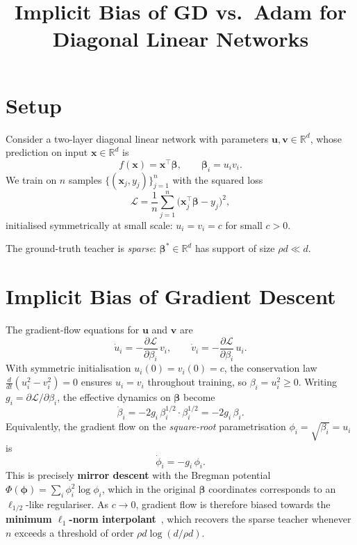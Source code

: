 \documentclass[11pt]{article}
\title{Implicit Bias of GD vs.\ Adam for Diagonal Linear Networks}
\date{}
\newcommand{\R}{\mathbb{R}}
\begin{document}
\maketitle

\section{Setup}

Consider a two-layer diagonal linear network with parameters $\mathbf{u}, \mathbf{v} \in \R^d$, whose
prediction on input $\mathbf{x} \in \R^d$ is
\[
    f(\mathbf{x}) = \mathbf{x}^\top \boldsymbol{\beta}, \qquad \boldsymbol{\beta}_i = u_i v_i.
\]
We train on $n$ samples $\{(\mathbf{x}_j, y_j)\}_{j=1}^n$ with the squared loss
\[
    \mathcal{L} = \frac{1}{n} \sum_{j=1}^n \bigl(\mathbf{x}_j^\top \boldsymbol{\beta} - y_j\bigr)^2,
\]
initialised symmetrically at small scale: $u_i = v_i = c$ for small $c > 0$.

The ground-truth teacher is \emph{sparse}: $\boldsymbol{\beta}^* \in \R^d$ has support of size $\rho d \ll d$.

\section{Implicit Bias of Gradient Descent}

The gradient-flow equations for $\mathbf{u}$ and $\mathbf{v}$ are
\[
    \dot{u}_i = -\frac{\partial \mathcal{L}}{\partial \beta_i} \, v_i, \qquad
    \dot{v}_i = -\frac{\partial \mathcal{L}}{\partial \beta_i} \, u_i.
\]
With symmetric initialisation $u_i(0) = v_i(0) = c$, the conservation law
$\tfrac{d}{dt}(u_i^2 - v_i^2) = 0$ ensures $u_i = v_i$ throughout training, so
$\beta_i = u_i^2 \geq 0$.  Writing $g_i = \partial \mathcal{L}/\partial \beta_i$, the
effective dynamics on $\boldsymbol{\beta}$ become
\[
    \dot{\beta}_i = -2g_i \,\beta_i^{1/2} \cdot \beta_i^{1/2} = -2g_i\,\beta_i.
\]
Equivalently, the gradient flow on the \emph{square-root} parametrisation
$\phi_i = \sqrt{\beta_i} = u_i$ is
\[
    \dot{\phi}_i = -g_i \,\phi_i.
\]
This is precisely \textbf{mirror descent} with the Bregman potential
$\Phi(\boldsymbol{\phi}) = \sum_i \phi_i^2 \log \phi_i$, which in the original
$\boldsymbol{\beta}$ coordinates corresponds to an $\ell_{1/2}$-like regulariser.  As
$c \to 0$, gradient flow is therefore biased towards the \textbf{minimum
$\ell_1$-norm interpolant}~\cite{woodworth2020kernel}, which recovers the
sparse teacher whenever $n$ exceeds a threshold of order $\rho d \log(d/\rho d)$.
\end{document}
